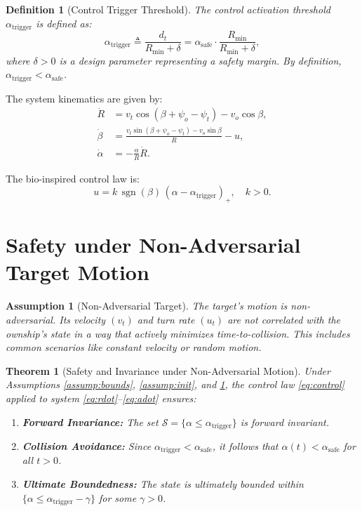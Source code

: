 \documentclass[10pt]{article}
\DeclareMathOperator{\sgn}{sgn}
\theoremstyle{plain}
\newtheorem{theorem}{Theorem}
\newtheorem{assumption}{Assumption}
\newtheorem{definition}{Definition}
\begin{document}
\begin{definition}[Control Trigger Threshold]\label{def:trigger}
    The control activation threshold $\alpha_{\text{trigger}}$ is defined as:
    \[
    \alpha_{\text{trigger}} \triangleq \frac{d_t}{R_{\text{min}} + \delta} = \alpha_{\text{safe}} \cdot \frac{R_{\text{min}}}{R_{\text{min}} + \delta},
    \]
    where $\delta > 0$ is a design parameter representing a safety margin. By definition, $\alpha_{\text{trigger}} < \alpha_{\text{safe}}$.
\end{definition}

The system kinematics are given by:
\begin{align}
    \dot{R} &= v_t \cos(\beta + \psi_o - \psi_t) - v_o \cos \beta, \label{eq:rdot} \\
    \dot{\beta} &= \frac{v_t \sin(\beta + \psi_o - \psi_t) - v_o \sin \beta}{R} - u, \label{eq:betadot} \\
    \dot{\alpha} &= -\frac{\alpha}{R} \dot{R}. \label{eq:adot}
\end{align}

The bio-inspired control law is:
\begin{equation}\label{eq:control}
    u = k \, \sgn(\beta) \, (\alpha - \alpha_{\text{trigger}})_+, \quad k > 0.
\end{equation}

\section{Safety under Non-Adversarial Target Motion}

\begin{assumption}[Non-Adversarial Target]\label{assump:nonadv}
    The target's motion is non-adversarial. Its velocity $(v_t)$ and turn rate $(u_t)$ are not correlated with the ownship's state in a way that actively minimizes time-to-collision. This includes common scenarios like constant velocity or random motion.
\end{assumption}

\begin{theorem}[Safety and Invariance under Non-Adversarial Motion]\label{thm:nonadv}
    Under Assumptions \ref{assump:bounds}, \ref{assump:init}, and \ref{assump:nonadv}, the control law \eqref{eq:control} applied to system \eqref{eq:rdot}--\eqref{eq:adot} ensures:
    \begin{enumerate}
        \item \textbf{Forward Invariance:} The set $\mathcal{S} = \{ \alpha \leq \alpha_{\text{trigger}} \}$ is forward invariant.
        \item \textbf{Collision Avoidance:} Since $\alpha_{\text{trigger}} < \alpha_{\text{safe}}$, it follows that $\alpha(t) < \alpha_{\text{safe}}$ for all $t > 0$.
        \item \textbf{Ultimate Boundedness:} The state is ultimately bounded within $\{ \alpha \leq \alpha_{\text{trigger}} - \gamma \}$ for some $\gamma > 0$.
    \end{enumerate}
\end{theorem}
\end{document}
